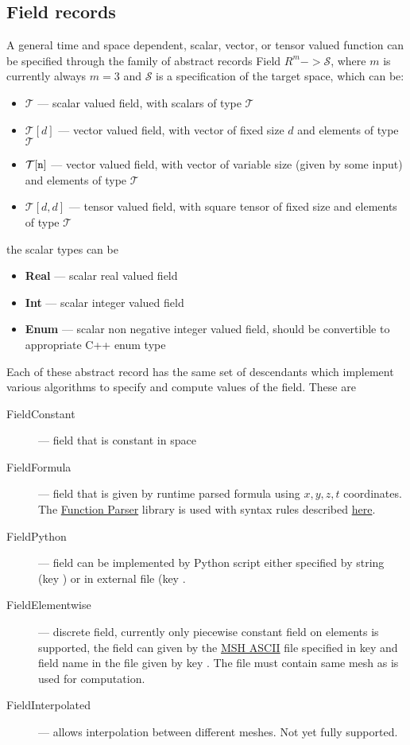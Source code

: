 \subsection{Field records}
\label{sec:Fields}
A general time and space dependent, scalar, vector, or  tensor valued function can be specified through the family of abstract records 
Field $R^m -> \mathcal{S}$, where $m$ is currently always $m=3$ and $\mathcal{S}$ is a specification of the target space, which can be:
\begin{itemize}
 \item {\bf $\mathcal{T}$} --- scalar valued field, with scalars of type $\mathcal{T}$
 \item {\bf $\mathcal{T}[d]$} --- vector valued field, with vector of fixed size $d$ and elements of type $\mathcal{T}$
 \item {\bf $\mathcal{T}[\tt n]$} --- vector valued field, with vector of variable size (given by some input) and elements of type $\mathcal{T}$
 \item {\bf $\mathcal{T}[d, d]$} --- tensor valued field, with square tensor of fixed size and elements of type $\mathcal{T}$
\end{itemize}
the scalar types can be
\begin{itemize}
 \item {\bf Real} --- scalar real valued field
 \item {\bf Int}  --- scalar integer valued field
 \item {\bf Enum} --- scalar non negative integer valued field, should be convertible to appropriate C++ enum type
\end{itemize}

Each of these abstract record has the same set of descendants which implement various algorithms to specify and compute values of the field. These are
\begin{description}
 \item[FieldConstant] --- field that is constant in space
 \item[FieldFormula] --- field that is given by runtime parsed formula using $x,y,z,t$ coordinates. The \href{http://warp.povusers.org/FunctionParser/}{Function Parser} library is used
 with syntax rules described \href{http://warp.povusers.org/FunctionParser/fparser.html#literals}{here}.
 \item[FieldPython] --- field can be implemented by Python script either specified by string (key ) 
 or in external file (key . 
 \item[FieldElementwise] --- discrete field, currently only piecewise constant field on elements is supported, the field can given by 
 the \href{http://geuz.org/gmsh/doc/texinfo/gmsh.html#MSH-ASCII-file-format}{MSH ASCII} file specified in key  and field name in the file given 
 by key . The file must contain same mesh as is used for computation.
 \item[FieldInterpolated] --- allows interpolation between different meshes. Not yet fully supported.
\end{description}

